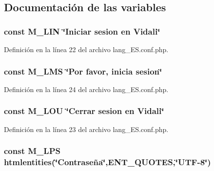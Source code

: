 \subsection{Documentación de las variables}
\hypertarget{lang__ES_8conf_8php_aba49d79918f2da98a19ce1e73d674f95}{
\subsubsection[{M\-\_\-\-L\-I\-N}]{\setlength{\rightskip}{0pt plus 5cm}const M\-\_\-\-L\-I\-N \char`\"{}Iniciar sesion en Vidali\char`\"{}}}\label{lang__ES_8conf_8php_aba49d79918f2da98a19ce1e73d674f95}


Definición en la línea 22 del archivo lang\-\_\-\-E\-S.\-conf.\-php.

\hypertarget{lang__ES_8conf_8php_af8bb8e5d1a085e8f984f8c811717122b}{
\subsubsection[{M\-\_\-\-L\-M\-S}]{\setlength{\rightskip}{0pt plus 5cm}const M\-\_\-\-L\-M\-S \char`\"{}Por favor, inicia sesion\char`\"{}}}\label{lang__ES_8conf_8php_af8bb8e5d1a085e8f984f8c811717122b}


Definición en la línea 24 del archivo lang\-\_\-\-E\-S.\-conf.\-php.

\hypertarget{lang__ES_8conf_8php_ab6a2c194e700c706f8e86e099778d4e8}{
\subsubsection[{M\-\_\-\-L\-O\-U}]{\setlength{\rightskip}{0pt plus 5cm}const M\-\_\-\-L\-O\-U \char`\"{}Cerrar sesion en Vidali\char`\"{}}}\label{lang__ES_8conf_8php_ab6a2c194e700c706f8e86e099778d4e8}


Definición en la línea 23 del archivo lang\-\_\-\-E\-S.\-conf.\-php.

\hypertarget{lang__ES_8conf_8php_a762ae5a0e2c725142d056d0c161e4b4e}{
\subsubsection[{M\-\_\-\-L\-P\-S}]{\setlength{\rightskip}{0pt plus 5cm}const M\-\_\-\-L\-P\-S htmlentities(\char`\"{}Contraseña\char`\"{},E\-N\-T\-\_\-\-Q\-U\-O\-T\-E\-S,\char`\"{}U\-T\-F-\/8\char`\"{})}}\label{lang__ES_8conf_8php_a762ae5a0e2c725142d056d0c161e4b4e}


